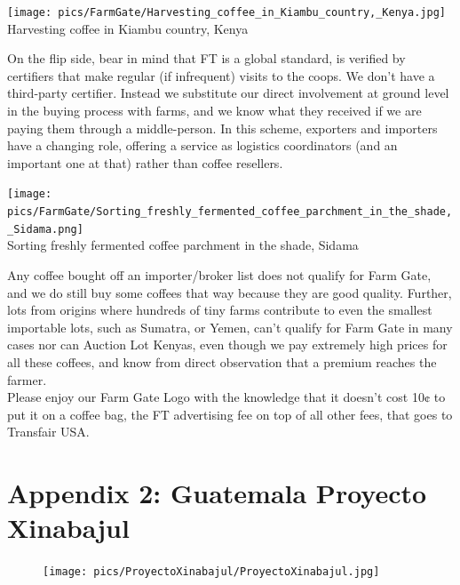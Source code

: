 \documentclass[10pt,twoside,footinclude=true,headinclude=true]{scrbook} %
\newlength{\mysize}
\newcommand{\myfontsize}[1]{
  \setlength{\mysize}{#1pt}
  \fontsize{\mysize}{1.2\mysize}
  \selectfont
}
\begin{document}
\begin{center}
	\texttt{[image: pics/FarmGate/Harvesting\_coffee\_in\_Kiambu\_country,\_Kenya.jpg]} \\
	\scriptsize
	Harvesting coffee in Kiambu country, Kenya
\end{center}
On the flip side, bear in mind that FT is a global standard, is verified by certifiers that make regular (if infrequent) visits to the coops. We don't have a third-party certifier. Instead we substitute our direct involvement at ground level in the buying process with farms, and we know what they received if we are paying them through a middle-person. In this scheme, exporters and importers have a changing role, offering a service as logistics coordinators (and an important one at that) rather than coffee resellers.\\
\begin{center}
	\texttt{[image: pics/FarmGate/Sorting\_freshly\_fermented\_coffee\_parchment\_in\_the\_shade,\_Sidama.png]} \\
	\scriptsize
	Sorting freshly fermented coffee parchment in the shade, Sidama
\end{center}
Any coffee bought off an importer/broker list does not qualify for Farm Gate, and we do still buy some coffees that way because they are good quality. Further, lots from origins where hundreds of tiny farms contribute to even the smallest importable lots, such as Sumatra, or Yemen, can't qualify for Farm Gate in many cases nor can Auction Lot Kenyas, even though we pay extremely high prices for all these coffees, and know from direct observation that a premium reaches the farmer.\\
\medskip
Please enjoy our Farm Gate Logo with the knowledge that it doesn't cost 10¢ to put it on a coffee bag, the FT advertising fee on top of all other fees, that goes to Transfair USA.\\

\chapter*{Appendix 2: Guatemala Proyecto Xinabajul}
\myfontsize{8.6}

\begin{figure}
  \vspace{-20pt}
  \begin{center}
    \texttt{[image: pics/ProyectoXinabajul/ProyectoXinabajul.jpg]}
  \end{center}
  \vspace{-20pt}
\end{figure}
\end{document}
